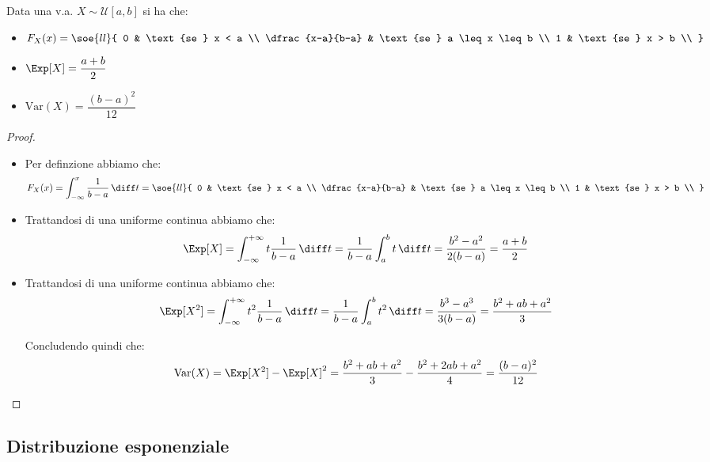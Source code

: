 \documentclass[a4paper, 12pt]{report}
\begin{document}
    \begin{framedprop}{}
        Data una v.a. $X \sim \mathcal{U}[a,b]$ si ha che:
        \begin{itemize}
            \item $\displaystyle F_X(x) = \soe{ll}{
                0 & \text{se } x < a \\
                \dfrac{x-a}{b-a} & \text{se } a \leq x \leq b \\
                1 & \text{se } x > b \\
            }$
            \item $\Exp[X] = \dfrac{a+b}{2}$
            \item $\mathrm{Var}(X) = \dfrac{(b-a)^2}{12}$
        \end{itemize}
    \end{framedprop}

    \begin{proof} \,
        
        \begin{itemize}
            \item Per definzione abbiamo che:
            \[F_X(x) = \int_{-\infty}^x \frac{1}{b-a} \, \diff t = \soe{ll}{
                0 & \text{se } x < a \\
                \dfrac{x-a}{b-a} & \text{se } a \leq x \leq b \\
                1 & \text{se } x > b \\
            }\]

            \item Trattandosi di una uniforme continua abbiamo che:
            \[\Exp[X] = \int_{-\infty}^{+\infty} t \frac{1}{b-a} \, \diff t = \frac{1}{b-a} \int_a^b t \, \diff t = \frac{b^2-a^2}{2(b-a)} = \frac{a+b}{2}\]

            \item Trattandosi di una uniforme continua abbiamo che:
            \[\Exp[X^2] = \int_{-\infty}^{+\infty} t^2 \frac{1}{b-a} \, \diff t = \frac{1}{b-a} \int_a^b t^2 \, \diff t = \frac{b^3-a^3}{3(b-a)} = \frac{b^2+ab+a^2}{3}\]

            Concludendo quindi che:
            \[\mathrm{Var}(X) = \Exp[X^2] - \Exp[X]^2 = \frac{b^2+ab+a^2}{3} - \frac{b^2+2ab+a^2}{4} = \frac{(b-a)^2}{12}\]
        \end{itemize}
    \end{proof}

    \newpage

    \subsection{Distribuzione esponenziale}
\end{document}

